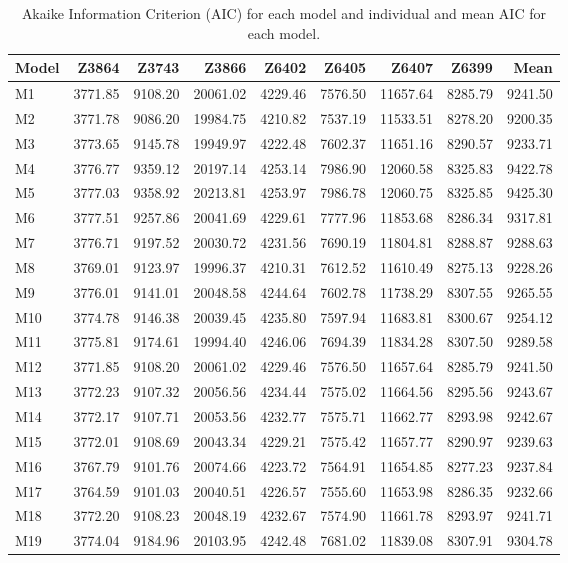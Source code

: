 \begin{table}[H]
\centering
\caption[AIC for each 
                       model and individual and 
                       mean AIC for each model]{Akaike Information Criterion (AIC) for each 
                       model and individual and 
                       mean AIC for each model.} 
\label{table:summary_AIC_BWA}
\begin{tabular}{lrrrrrrrr}
  \hline
Model & Z3864 & Z3743 & Z3866 & Z6402 & Z6405 & Z6407 & Z6399 & Mean \\ 
  \hline
M1 & 3771.85 & 9108.20 & 20061.02 & 4229.46 & 7576.50 & 11657.64 & 8285.79 & 9241.50 \\ 
  M2 & 3771.78 & 9086.20 & 19984.75 & 4210.82 & 7537.19 & 11533.51 & 8278.20 & 9200.35 \\ 
  M3 & 3773.65 & 9145.78 & 19949.97 & 4222.48 & 7602.37 & 11651.16 & 8290.57 & 9233.71 \\ 
  M4 & 3776.77 & 9359.12 & 20197.14 & 4253.14 & 7986.90 & 12060.58 & 8325.83 & 9422.78 \\ 
  M5 & 3777.03 & 9358.92 & 20213.81 & 4253.97 & 7986.78 & 12060.75 & 8325.85 & 9425.30 \\ 
  M6 & 3777.51 & 9257.86 & 20041.69 & 4229.61 & 7777.96 & 11853.68 & 8286.34 & 9317.81 \\ 
  M7 & 3776.71 & 9197.52 & 20030.72 & 4231.56 & 7690.19 & 11804.81 & 8288.87 & 9288.63 \\ 
  M8 & 3769.01 & 9123.97 & 19996.37 & 4210.31 & 7612.52 & 11610.49 & 8275.13 & 9228.26 \\ 
  M9 & 3776.01 & 9141.01 & 20048.58 & 4244.64 & 7602.78 & 11738.29 & 8307.55 & 9265.55 \\ 
  M10 & 3774.78 & 9146.38 & 20039.45 & 4235.80 & 7597.94 & 11683.81 & 8300.67 & 9254.12 \\ 
  M11 & 3775.81 & 9174.61 & 19994.40 & 4246.06 & 7694.39 & 11834.28 & 8307.50 & 9289.58 \\ 
  M12 & 3771.85 & 9108.20 & 20061.02 & 4229.46 & 7576.50 & 11657.64 & 8285.79 & 9241.50 \\ 
  M13 & 3772.23 & 9107.32 & 20056.56 & 4234.44 & 7575.02 & 11664.56 & 8295.56 & 9243.67 \\ 
  M14 & 3772.17 & 9107.71 & 20053.56 & 4232.77 & 7575.71 & 11662.77 & 8293.98 & 9242.67 \\ 
  M15 & 3772.01 & 9108.69 & 20043.34 & 4229.21 & 7575.42 & 11657.77 & 8290.97 & 9239.63 \\ 
  M16 & 3767.79 & 9101.76 & 20074.66 & 4223.72 & 7564.91 & 11654.85 & 8277.23 & 9237.84 \\ 
  M17 & 3764.59 & 9101.03 & 20040.51 & 4226.57 & 7555.60 & 11653.98 & 8286.35 & 9232.66 \\ 
  M18 & 3772.20 & 9108.23 & 20048.19 & 4232.67 & 7574.90 & 11661.78 & 8293.97 & 9241.71 \\ 
  M19 & 3774.04 & 9184.96 & 20103.95 & 4242.48 & 7681.02 & 11839.08 & 8307.91 & 9304.78 \\ 
   \hline
\end{tabular}
\end{table}
